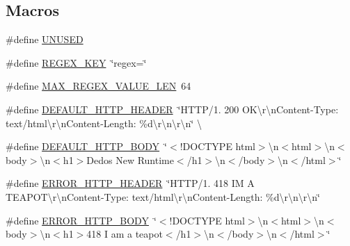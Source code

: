 \subsection*{Macros}
\begin{DoxyCompactItemize}
\item 
\#define \hyperlink{connection-handler_8c_addf5ec070e9499d36b7f2009ce736076}{U\-N\-U\-S\-E\-D}
\item 
\#define \hyperlink{connection-handler_8c_afcd8c081c0b7326ca8ac997adec10a4b}{R\-E\-G\-E\-X\-\_\-\-K\-E\-Y}~\char`\"{}regex=\char`\"{}
\item 
\#define \hyperlink{connection-handler_8c_a72d23e8f74e409a7e5fb8a3875888a4c}{M\-A\-X\-\_\-\-R\-E\-G\-E\-X\-\_\-\-V\-A\-L\-U\-E\-\_\-\-L\-E\-N}~64
\item 
\#define \hyperlink{connection-handler_8c_a70992e4154471284e27ecd7566edbcb1}{D\-E\-F\-A\-U\-L\-T\-\_\-\-H\-T\-T\-P\-\_\-\-H\-E\-A\-D\-E\-R}~\char`\"{}H\-T\-T\-P/1. 200 O\-K\textbackslash{}r\textbackslash{}n\-Content-\/Type\-: text/html\textbackslash{}r\textbackslash{}n\-Content-\/Length\-: \%d\textbackslash{}r\textbackslash{}n\textbackslash{}r\textbackslash{}n\char`\"{} \textbackslash{}
\item 
\#define \hyperlink{connection-handler_8c_a2870bb55c6ebf7807375ec589e6a1919}{D\-E\-F\-A\-U\-L\-T\-\_\-\-H\-T\-T\-P\-\_\-\-B\-O\-D\-Y}~\char`\"{}$<$!D\-O\-C\-T\-Y\-P\-E html$>$\textbackslash{}n$<$html$>$\textbackslash{}n$<$body$>$\textbackslash{}n$<$h1$>$Dedos New Runtime$<$/h1$>$\textbackslash{}n$<$/body$>$\textbackslash{}n$<$/html$>$\char`\"{}
\item 
\#define \hyperlink{connection-handler_8c_a67d39d570f96cb3089b3ece26f644343}{E\-R\-R\-O\-R\-\_\-\-H\-T\-T\-P\-\_\-\-H\-E\-A\-D\-E\-R}~\char`\"{}H\-T\-T\-P/1. 418 I\-M A T\-E\-A\-P\-O\-T\textbackslash{}r\textbackslash{}n\-Content-\/Type\-: text/html\textbackslash{}r\textbackslash{}n\-Content-\/Length\-: \%d\textbackslash{}r\textbackslash{}n\textbackslash{}r\textbackslash{}n\char`\"{}
\item 
\#define \hyperlink{connection-handler_8c_a5ec8531b329b421d3b4c17cc17c37d5c}{E\-R\-R\-O\-R\-\_\-\-H\-T\-T\-P\-\_\-\-B\-O\-D\-Y}~\char`\"{}$<$!D\-O\-C\-T\-Y\-P\-E html$>$\textbackslash{}n$<$html$>$\textbackslash{}n$<$body$>$\textbackslash{}n$<$h1$>$418 I am a teapot$<$/h1$>$\textbackslash{}n$<$/body$>$\textbackslash{}n$<$/html$>$\char`\"{}
\end{DoxyCompactItemize}
